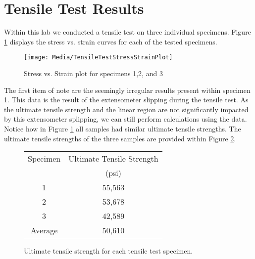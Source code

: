 \documentclass{article}
\newcommand{\YearPath}{../../../LatexConfig} %
\newcommand{\SemesterPath}{../../LatexConfig} %
\newcommand{\ClassPath}{../LatexConfig} %
\begin{document}




\section{Tensile Test Results}
Within this lab we conducted a tensile test on three individual specimens. Figure \ref{fig:TensileStressstrain} displays the stress vs. strain curves for each of the tested specimens.
\begin{figure}[H]
\begin{center}
\texttt{[image: Media/TensileTestStressStrainPlot]}
\caption{Stress vs. Strain plot for specimens 1,2, and 3}
\label{fig:TensileStressstrain}
\end{center}
\end{figure}


The first item of note are the seemingly irregular results present within specimen 1. This data is the result of the extensometer slipping during the tensile test. As the ultimate tensile strength and the linear region are not significantly impacted by this extensometer splipping, we can still perform calculations using the data. Notice how in Figure \ref{fig:TensileStressstrain} all samples had similar ultimate tensile strengths. The ultimate tensile strengths of the three samples are provided within Figure \ref{tab:UltimateTensile}.


\begin{figure}[H]
\begin{center}
  \begin{tabular}{|c|c|}
    \hline
    Specimen & Ultimate Tensile Strength\\ 
             & (psi) \\
    \hline
    1 & 55,563 \\
    2 & 53,678 \\
    3 & 42,589 \\
    \hline
    Average & 50,610 \\
    \hline
  \end{tabular}
  \caption{Ultimate tensile strength for each tensile test specimen.}
  \label{tab:UltimateTensile}
\end{center}
\end{figure}
\end{document}
